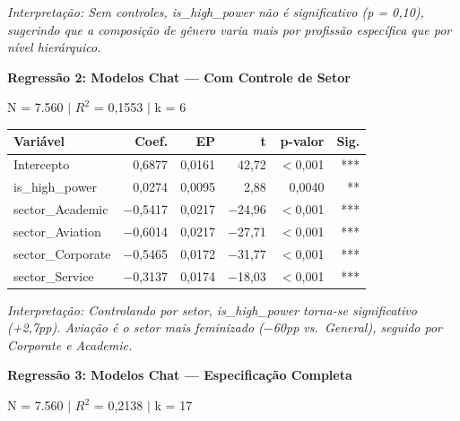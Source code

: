 \documentclass[12pt,a4paper]{article}
\begin{document}
\noindent\textit{Interpretação: Sem controles, is\_high\_power não é significativo (p =
0,10), sugerindo que a composição de gênero varia mais por profissão
específica que por nível hierárquico.}

\vspace{0.5cm}
\noindent\textbf{Regressão 2: Modelos Chat --- Com Controle de Setor}

\noindent N = 7.560 $|$ $R^2$ = 0,1553 $|$ k = 6

\begin{table}[H]
\centering
\begin{tabular}{lrrrrr}
\toprule
\textbf{Variável} & \textbf{Coef.} & \textbf{EP} & \textbf{t} & \textbf{p-valor} & \textbf{Sig.} \\
\midrule
Intercepto & 0,6877 & 0,0161 & 42,72 & $<$0,001 & *** \\
is\_high\_power & 0,0274 & 0,0095 & 2,88 & 0,0040 & ** \\
sector\_Academic & $-$0,5417 & 0,0217 & $-$24,96 & $<$0,001 & *** \\
sector\_Aviation & $-$0,6014 & 0,0217 & $-$27,71 & $<$0,001 & *** \\
sector\_Corporate & $-$0,5465 & 0,0172 & $-$31,77 & $<$0,001 & *** \\
sector\_Service & $-$0,3137 & 0,0174 & $-$18,03 & $<$0,001 & *** \\
\bottomrule
\end{tabular}
\end{table}

\noindent\textit{Interpretação: Controlando por setor, is\_high\_power torna-se
significativo (+2,7pp). Aviação é o setor mais feminizado ($-$60pp vs.\
General), seguido por Corporate e Academic.}

\vspace{0.5cm}
\noindent\textbf{Regressão 3: Modelos Chat --- Especificação Completa}

\noindent N = 7.560 $|$ $R^2$ = 0,2138 $|$ k = 17
\end{document}
